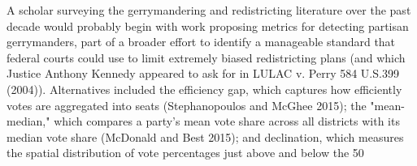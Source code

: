 \documentclass{cup-pan}
\begin{document}
A scholar surveying the gerrymandering and redistricting literature over the past decade would probably begin with work proposing metrics for detecting partisan gerrymanders, part of a broader effort to identify a manageable standard that federal courts could use to limit extremely biased redistricting plans (and which Justice Anthony Kennedy appeared to ask for in LULAC v. Perry 584 U.S.399 (2004)). Alternatives included the efficiency gap, which captures how efficiently votes are aggregated into seats (Stephanopoulos and McGhee 2015); the "mean-median," which compares a party's mean vote share across all districts with its median vote share (McDonald and Best 2015); and declination, which measures the spatial distribution of vote percentages just above and below the 50%
\end{document}
